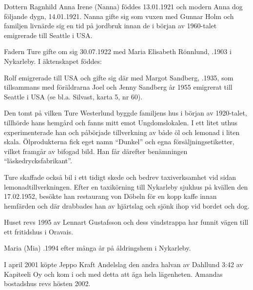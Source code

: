 Dottern Ragnhild Anna Irene (Nanna) föddes 13.01.1921 och modern Anna dog följande dygn, 14.01.1921. Nanna gifte sig som vuxen med Gunnar Holm och familjen livnärde sig en tid på jordbruk innan de i början av 1960-talet emigrerade till Seattle i USA.

Fadern Ture gifte om sig 30.07.1922 med Maria Elisabeth Rönnlund, .1903 i Nykarleby. I äktenskapet föddes:
\begin{jhchildren}
  \item {}
  \item {}
\end{jhchildren}
Rolf emigrerade till USA och gifte sig där med Margot Sandberg, .1935, som tillsammans med föräldrarna Joel och Jenny Sandberg år 1955 emigrerat till Seattle i USA (se bl.a. Silvast, karta 5, nr 60).

Den tomt på vilken Ture Westerlund byggde familjens hus i början av 1920-talet, tillhörde hans hemgård och fanns mitt emot Ungdomslokalen. I ett litet uthus experimenterade han och påbörjade tillverkning av både öl och lemonad i liten skala. Ölprodukterna fick eget namn ``Dunkel'' och egna försäljningsetiketter, vilket framgår av bifogad bild. Han får därefter benämningen ``läskedrycksfabrikant''.

Ture skaffade också bil i ett tidigt skede och bedrev taxiverksamhet vid sidan lemonadtillverkningen. Efter en taxikörning till Nykarleby sjukhus på kvällen den 17.02.1952, besökte han restaurang von Döbeln för en kopp kaffe innan hemfärden och där drabbades han av hjärtslag och sjönk ihop vid bordet och dog.

Huset revs 1995 av Lennart Gustafsson och dess vindstrappa har funnit vägen till ett fritidshus i Oravais.

Maria (Mia) .1994 efter många år på åldringshem i Nykarleby.






I april 2001 köpte Jeppo Kraft Andelslag den andra halvan av Dahllund 3:42 av Kapiteeli Oy och kom i och med detta att äga hela lägenheten. Amandas bostadshus revs hösten 2002.


